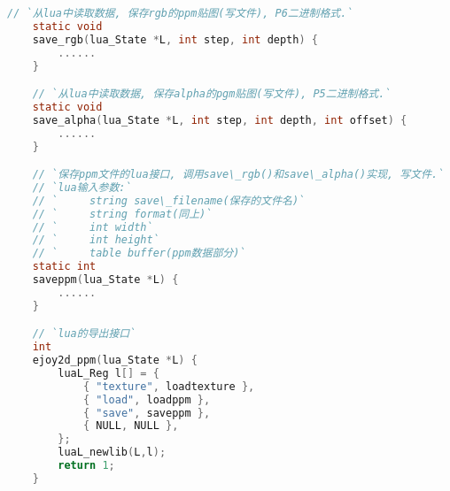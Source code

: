 {\begin{lstlisting}[language=C]
    // `从lua中读取数据, 保存rgb的ppm贴图(写文件), P6二进制格式.`
    static void
    save_rgb(lua_State *L, int step, int depth) {
        ......
    }

    // `从lua中读取数据, 保存alpha的pgm贴图(写文件), P5二进制格式.`
    static void
    save_alpha(lua_State *L, int step, int depth, int offset) {
        ......
    }

    // `保存ppm文件的lua接口, 调用save\_rgb()和save\_alpha()实现, 写文件.`
    // `lua输入参数:`
    // `     string save\_filename(保存的文件名)`
    // `     string format(同上)`
    // `     int width`
    // `     int height`
    // `     table buffer(ppm数据部分)`
    static int
    saveppm(lua_State *L) {
        ......
    }

    // `lua的导出接口`
    int
    ejoy2d_ppm(lua_State *L) {
        luaL_Reg l[] = {
            { "texture", loadtexture },
            { "load", loadppm },
            { "save", saveppm },
            { NULL, NULL },
        };
        luaL_newlib(L,l);
        return 1;
    }

    \end{lstlisting}
}


